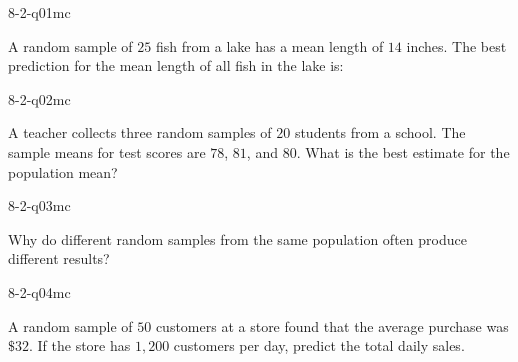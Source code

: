 

\begin{practiceQuestion}{8-2-q01}{mc}
\begin{questionText}
A random sample of $25$ fish from a lake has a mean length of $14$ inches. The best prediction for the mean length of all fish in the lake is:
\end{questionText}
\end{practiceQuestion}

\begin{practiceQuestion}{8-2-q02}{mc}
\begin{questionText}
A teacher collects three random samples of $20$ students from a school. The sample means for test scores are $78$, $81$, and $80$. What is the best estimate for the population mean?
\end{questionText}
\end{practiceQuestion}

\begin{practiceQuestion}{8-2-q03}{mc}
\begin{questionText}
Why do different random samples from the same population often produce different results?
\end{questionText}
\end{practiceQuestion}

\begin{practiceQuestion}{8-2-q04}{mc}
\begin{questionText}
A random sample of $50$ customers at a store found that the average purchase was $\$32$. If the store has $1{,}200$ customers per day, predict the total daily sales.
\end{questionText}
\end{practiceQuestion}

